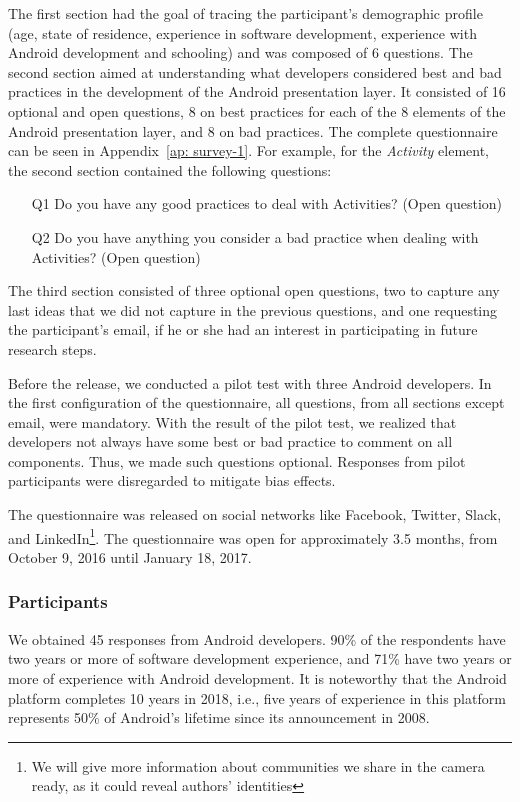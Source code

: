 The first section had the goal of tracing the participant's demographic profile (age, state of residence, experience in software development, experience with Android development and schooling) and was composed of 6 questions. The second section aimed at understanding what developers considered best and bad practices in the development of the Android presentation layer. It consisted of 16 optional and open questions, 8 on best practices for each of the 8 elements of the Android presentation layer, and 8 on bad practices. The complete questionnaire can be seen in Appendix~\ref{ap: survey-1}. 
For example, for the \textit{Activity} element, the second section contained the following questions:

\begin{itemize}
  \item[Q1] Do you have any good practices to deal with Activities? (Open question)
  \item[Q2] Do you have anything you consider a bad practice when dealing with Activities? (Open question)
\end{itemize}


The third section consisted of three optional open questions, 
two to capture any last ideas that we did not capture in the previous questions, and one requesting the participant's email, if he or she had an interest in participating in future research steps.

Before the release, we conducted a pilot test with three Android developers. In the first configuration of the questionnaire, all questions, from all sections except email, were mandatory. With the result of the pilot test, we realized that developers not always have some best or bad practice to comment on all components. Thus, we made such questions optional. Responses from pilot participants were disregarded to mitigate bias effects.

The questionnaire was released on social networks like Facebook, Twitter, Slack, and LinkedIn\footnote{We will give more information about communities we share in the camera ready, as it could reveal authors' identities}. The questionnaire was open for approximately 3.5 months, from October 9, 2016 until January 18, 2017.

\subsubsection{Participants}
\label{etapa-1-participantes}

We obtained 45 responses from Android developers. 
90\% of the respondents have two years or more of software development experience, 
and 71\% have two years or more of experience with Android development. 
It is noteworthy that the Android platform completes 10 years in 2018, i.e., 
five years of experience in this platform represents 50\% of Android's lifetime
since its announcement in 2008.

